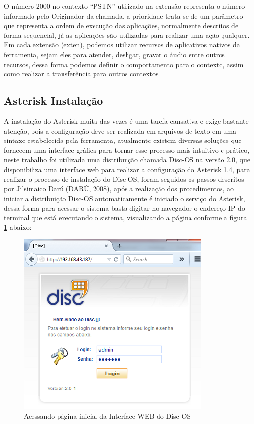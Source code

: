 O número 2000 no contexto “PSTN” utilizado na extensão representa o número informado pelo Originador da chamada, a prioridade trata-se de um parâmetro que representa a ordem de execução das aplicações, normalmente descritos de forma sequencial, já as aplicações são utilizadas para realizar uma ação qualquer. Em cada extensão (exten), podemos utilizar recursos de aplicativos nativos da ferramenta, sejam eles para atender, desligar, gravar o áudio entre outros recursos, dessa forma podemos definir o comportamento para o contexto, assim como realizar a transferência para outros contextos.


\subsection{Asterisk Instalação}

A instalação do Asterisk muita das vezes é uma tarefa cansativa e exige bastante atenção, pois a configuração deve ser realizada em arquivos de texto em uma sintaxe estabelecida pela ferramenta, atualmente existem diversas soluções que fornecem uma interface gráfica para tornar esse processo mais intuitivo e prático, neste trabalho foi utilizada uma distribuição chamada Disc-OS na versão 2.0, que disponibiliza uma interface web para realizar a configuração do Asterisk 1.4, para realizar o processo de instalação do Disc-OS, foram seguidos os passos descritos por Jilsimaico Darú (DARÚ, 2008), após a realização dos procedimentos, ao iniciar a distribuição Disc-OS automaticamente é iniciado o serviço do Asterisk, dessa forma para acessar o sistema basta digitar no navegador o endereço IP do terminal que está executando o sistema, visualizando a página conforme a figura \ref{figura:asteriskInterfaceWeb} abaixo:


\begin{figure}[!htb]
	\centering
	\caption{Acessando página inicial da Interface WEB do Disc-OS}	
	\label{figura:asteriskInterfaceWeb}
	\includegraphics{figuras/pagina_inicial_asterisk.png}
\end{figure}


